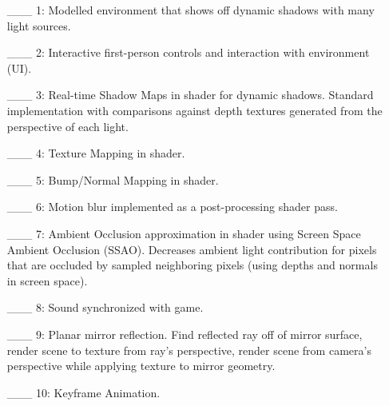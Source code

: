 \documentclass {article}
\begin{document}
\begin{enumerate}
  \item[\_\_\_ 1:]  Modelled environment that shows off dynamic shadows with many light sources.

  \item[\_\_\_ 2:]  Interactive first-person controls and interaction with environment (UI).

  \item[\_\_\_ 3:]  Real-time Shadow Maps in shader for dynamic shadows. Standard implementation with comparisons against depth textures generated from the perspective of each light.

  \item[\_\_\_ 4:]  Texture Mapping in shader.

  \item[\_\_\_ 5:]  Bump/Normal Mapping in shader.

  \item[\_\_\_ 6:]  Motion blur implemented as a post-processing shader pass.

  \item[\_\_\_ 7:]  Ambient Occlusion approximation in shader using Screen Space Ambient Occlusion (SSAO). Decreases ambient light contribution for pixels that are occluded by sampled neighboring pixels (using depths and normals in screen space).

  \item[\_\_\_ 8:]  Sound synchronized with game.

  \item[\_\_\_ 9:]  Planar mirror reflection. Find reflected ray off of mirror surface, render scene to texture from ray's perspective, render scene from camera's perspective while applying texture to mirror geometry.

  \item[\_\_\_ 10:] Keyframe Animation.
\end{enumerate}

\end{document}

